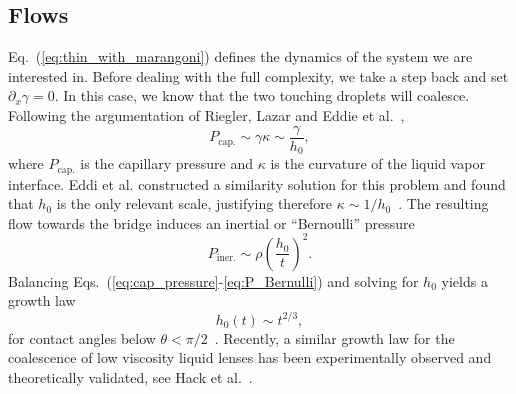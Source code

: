 \documentclass[twocolumn,amsmath,amssymb,showpacs,pre,nofootinbib,superscriptaddress]{revtex4-1} %
\begin{document}
\subsection{Flows}\label{subsec:flows_theory}
Eq.~(\ref{eq:thin_with_marangoni}) defines the dynamics of the system we are interested in.
Before dealing with the full complexity, we take a step back and set $\partial_x\gamma = 0$.
In this case, we know that the two touching droplets will coalesce.
Following the argumentation of Riegler, Lazar and Eddie et al.~\cite{doi:10.1021/la800630w, PhysRevLett.111.144502},
\begin{equation}\label{eq:cap_pressure}
    P_{\text{cap.}} \sim\gamma\kappa \sim \frac{\gamma}{h_0},
\end{equation}
where $P_{\text{cap.}}$ is the capillary pressure and $\kappa$ is the curvature of the liquid vapor interface.
Eddi et al. constructed a similarity solution for this problem and found that $h_0$ is the only relevant scale, justifying therefore $\kappa \sim 1/h_0$~\cite{PhysRevLett.111.144502}. 
The resulting flow towards the bridge induces an inertial or ``Bernoulli'' pressure
\begin{equation}\label{eq:P_Bernulli}
    P_{\text{iner.}} \sim \rho\left(\frac{h_0}{t}\right)^2.
\end{equation}
Balancing Eqs.~(\ref{eq:cap_pressure}-\ref{eq:P_Bernulli}) and solving for $h_0$ yields a growth law 
\begin{equation}\label{eq:coal_powerlaw}
    h_0(t) \sim t^{2/3},
\end{equation}
for contact angles below $\theta < \pi/2$~\cite{PhysRevLett.111.144502, keller2002breaking}.
Recently, a similar growth law for the coalescence of low viscosity liquid lenses has been experimentally observed and theoretically validated, see Hack et al.~\cite{PhysRevLett.124.194502}.
\end{document}
